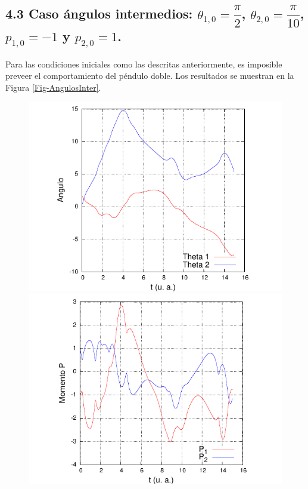 \documentclass[10pt,letterpaper]{article}
\begin{document}
\subsection*{4.3 Caso ángulos intermedios: $\theta_{1,0} = \dfrac{\pi}{2}$, $\theta_{2,0} = \dfrac{\pi}{10}$, $p_{1,0} = -1$ y $p_{2,0} = 1$.}
Para las condiciones iniciales como las descritas anteriormente, es imposible preveer el comportamiento del péndulo doble. Los resultados se muestran en la Figura \ref{Fig-AngulosInter}.
\begin{figure}
\centering
\includegraphics[scale=0.9]{MGrafica_Theta_Tiempo.pdf}
\includegraphics[scale=0.9]{MGrafica_P_Tiempo.pdf}

\end{figure}
\end{document}
